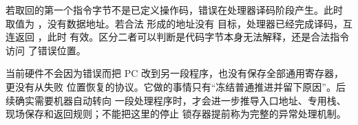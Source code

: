 若取回的第一个指令字节不是已定义操作码，错误在处理器译码阶段产生。此时
 取值为 ，没有数据地址。若合法
 形成的地址没有
目标，处理器已经完成译码，互连返回 ，此时
 有效。区分二者可以判断是代码字节本身无法解释，还是合法指令访问
了错误位置。


当前硬件不会因为错误而把 PC 改到另一段程序，也没有保存全部通用寄存器，更没有从失败
位置恢复的协议。它做的事情只有“冻结普通推进并留下原因”。后续确实需要机器自动转向
一段处理程序时，才会进一步推导入口地址、专用栈、现场保存和返回规则；不能把这里的停止
锁存器提前称为完整的异常处理机制。
